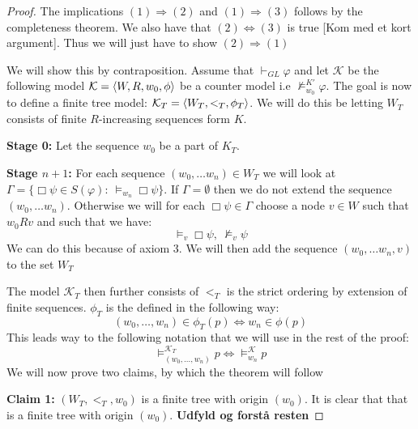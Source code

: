 \documentclass[../main.tex]{subfiles}
\begin{document}
\begin{proof}
	The implications $(1)\Rightarrow (2)$ and $(1)\Rightarrow(3)$ follows
	by the completeness theorem. We also have that $(2)\Leftrightarrow (3)$
	is true [Kom med et kort argument]. Thus we will just have to show $(2)\Rightarrow(1)$

We will show this by contraposition. Assume that $\vdash_{GL}\varphi$ and
let $\mathcal{K}$ be the following model $\mathcal{K}=\langle W,R,w_0,\phi\rangle $ be a counter model i.e
	$\not\vDash_{w_0}^{K'}\varphi$. The goal is now to define a finite tree
	model: $\mathcal{K}_T=\langle W_T,<_T,\phi_T\rangle$. We will do this be
	letting $W_T$ consists of finite $R$-increasing sequences form $K$.

	\textbf{Stage 0:} Let the sequence $w_0$ be a part of $K_T$.

	\textbf{Stage $n+1$:} For each sequence $(w_0,\ldots w_n)\in W_T$ we
	will look at $\Gamma=\{\Box\psi\in S(\varphi):\ \vDash_{w_n}\Box\psi\}$.
	If $\Gamma=\emptyset$ then we do not extend the sequence $(w_0,\ldots
	w_n)$. Otherwise we will for each $\Box\psi\in\Gamma$ choose a node
	$v\in W$ such that $w_0Rv$ and such that we have:
	$$\vDash_v\Box\psi,\ \not\vDash_v\psi$$
	We can do this because of axiom 3. We will then add the sequence
	$(w_0,\ldots w_n,v)$ to the set $W_T$

	The model $\mathcal{K}_T$ then further consists of $<_T$ is the strict
	ordering by extension of finite sequences. $\phi_T$ is the defined in
	the following way:
	$$(w_0,\ldots,w_n)\in \phi_T(p)\Leftrightarrow w_n\in\phi(p)$$
	This leads way to the following notation that we will use in the rest
	of the proof:
	$$\vDash_{(w_0,\ldots,w_n)}^{\mathcal{K}_T}p\Leftrightarrow\vDash_{w_n}^\mathcal{K} p$$
	We will now prove two claims, by which the theorem will follow 

	\textbf{Claim 1:} $(W_T,<_T,w_0)$ is a finite tree with origin $(w_0)$.
	It is clear that that is a finite tree with origin $(w_0)$.
	\textbf{Udfyld og forstå resten}


\end{proof}
\end{document}
